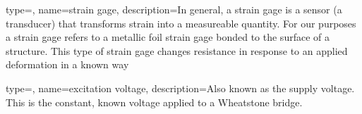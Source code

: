 {
type=\thisgls,
name={strain gage},
description={In general, a strain gage is a sensor (a transducer) that transforms strain into a measureable quantity.  For our purposes a strain gage refers to a metallic foil strain gage bonded to the surface of a structure.  This type of strain gage changes resistance in response to an applied deformation in a known way}
}

{
type=\thisgls,
name={excitation voltage},
description={Also known as the supply voltage.  This is the constant, known voltage applied to a Wheatstone bridge.}
}


